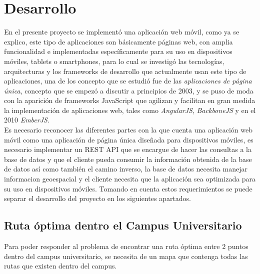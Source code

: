 \chapter{Desarrollo}
\label{chap:desarrollo}



En el presente proyecto se implementó una aplicación web móvil, como ya se explico, este tipo de aplicaciones son básicamente páginas web, con amplia funcionalidad e implementadas específicamente para su uso en dispositivos móviles, tablets o smartphones, para lo cual se investigó las tecnologías, arquitecturas y los frameworks de desarrollo que actualmente usan este tipo de aplicaciones, una de los concepto que se estudió fue de las \emph{aplicaciones de página única}, concepto que se empezó a discutir a principios de 2003, y se puso de moda con la aparición de frameworks JavaScript que agilizan y facilitan en gran medida la implementación de aplicaciones web, tales como \emph{AngularJS}, \emph{BackboneJS} y en el 2010 \emph{EmberJS}. \\

Es necesario reconocer las diferentes partes con la que cuenta una aplicación web móvil como una aplicación de página única diseñada para dispositivos móviles, es necesario implementar un REST API que se encargue de hacer las consultas a la base de datos y que el cliente pueda consumir la información obtenida de la base de datos así como también el camino inverso, la base de datos necesita manejar informacion geoespacial y el cliente necesita que la aplicación sea optimizada para su uso en dispositivos móviles. Tomando en cuenta estos requerimientos se puede separar el desarrollo del proyecto en los siguientes apartados. \\



\section{Ruta óptima dentro el Campus Universitario}
\label{sec:generar_mapa_rutas}

Para poder responder al problema de encontrar una ruta óptima entre 2 puntos dentro del campus universitario, se necesita de un mapa que contenga todas las rutas que existen dentro del campus.\\


